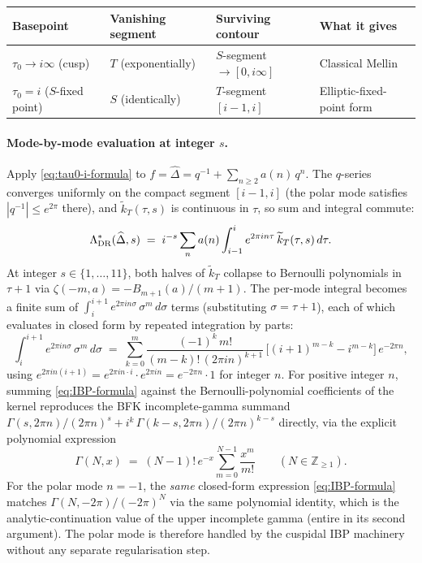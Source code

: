 \documentclass[11pt,letterpaper]{article}
\newcommand{\ZZ}{\mathbb{Z}}
\newcommand{\Dhat}{\widehat{\Delta}}
\begin{document}
\begin{center}
\begin{tabular}{llll}
\toprule
Basepoint & Vanishing segment & Surviving contour & What it gives \\
\midrule
$\tau_0 \to i\infty$ (cusp) & $T$ (exponentially) & $S$-segment $\to [0, i\infty]$ & Classical Mellin \\
$\tau_0 = i$ ($S$-fixed point) & $S$ (identically) & $T$-segment $[i-1, i]$ & Elliptic-fixed-point form \\
\bottomrule
\end{tabular}
\end{center}

\paragraph{Mode-by-mode evaluation at integer $s$.}
Apply \eqref{eq:tau0-i-formula} to $f = \Dhat = q^{-1} + \sum_{n \ge 2} a(n)\,q^n$.  The $q$-series converges uniformly on the compact segment $[i-1, i]$ (the polar mode satisfies $|q^{-1}| \le e^{2\pi}$ there), and $\widetilde{k}_T(\tau, s)$ is continuous in $\tau$, so sum and integral commute:
\begin{equation}\label{eq:tau0-i-modewise}
\Lambda^*_{\rm DR}(\Dhat, s) \;=\; i^{-s}\sum_n a(n) \int_{i-1}^{i} e^{2\pi i n \tau}\,\widetilde{k}_T(\tau, s)\,d\tau.
\end{equation}
At integer $s \in \{1, \ldots, 11\}$, both halves of $\widetilde{k}_T$ collapse to Bernoulli polynomials in $\tau + 1$ via $\zeta(-m, a) = -B_{m+1}(a)/(m+1)$.  The per-mode integral becomes a finite sum of $\int_i^{i+1} e^{2\pi i n \sigma}\,\sigma^m\,d\sigma$ terms (substituting $\sigma = \tau + 1$), each of which evaluates in closed form by repeated integration by parts:
\begin{equation}\label{eq:IBP-formula}
\int_i^{i+1} e^{2\pi i n \sigma}\,\sigma^m\,d\sigma
\;=\; \sum_{k=0}^{m} \frac{(-1)^k\, m!}{(m-k)!\,(2\pi i n)^{k+1}}\,\bigl[(i+1)^{m-k} - i^{m-k}\bigr]\,e^{-2\pi n},
\end{equation}
using $e^{2\pi i n (i+1)} = e^{2\pi i n \cdot i}\cdot e^{2\pi i n} = e^{-2\pi n}\cdot 1$ for integer $n$.  For positive integer $n$, summing \eqref{eq:IBP-formula} against the Bernoulli-polynomial coefficients of the kernel reproduces the BFK incomplete-gamma summand $\Gamma(s, 2\pi n)/(2\pi n)^s + i^k\,\Gamma(k-s, 2\pi n)/(2\pi n)^{k-s}$ directly, via the explicit polynomial expression
\[
\Gamma(N, x) \;=\; (N-1)!\,e^{-x}\sum_{m=0}^{N-1}\frac{x^m}{m!}\qquad (N \in \ZZ_{\ge 1}).
\]
For the polar mode $n = -1$, the \emph{same} closed-form expression \eqref{eq:IBP-formula} matches $\Gamma(N, -2\pi)/(-2\pi)^N$ via the same polynomial identity, which is the analytic-continuation value of the upper incomplete gamma (entire in its second argument).  The polar mode is therefore handled by the cuspidal IBP machinery without any separate regularisation step.
\end{document}
